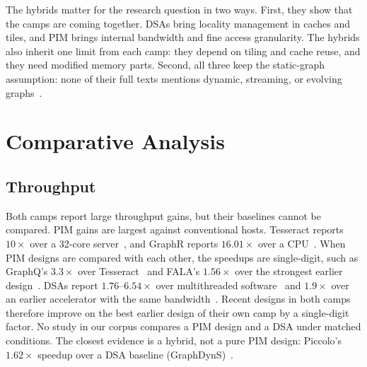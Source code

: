 \documentclass[journal,onecolumn]{IEEEtran}
\begin{document}
The hybrids matter for the research question in two ways. First, they show that the camps are coming together. DSAs bring locality management in caches and tiles, and PIM brings internal bandwidth and fine access granularity. The hybrids also inherit one limit from each camp: they depend on tiling and cache reuse, and they need modified memory parts. Second, all three keep the static-graph assumption: none of their full texts mentions dynamic, streaming, or evolving graphs~\cite{shin2025piccolo,shin2025fala,yenimol2026cograf}.

\section{Comparative Analysis}\label{sec:analysis}
\subsection{Throughput}
Both camps report large throughput gains, but their baselines cannot be compared. PIM gains are largest against conventional hosts. Tesseract reports $10\times$ over a 32-core server~\cite{ahn2015tesseract}, and GraphR reports $16.01\times$ over a CPU~\cite{song2018graphr}. When PIM designs are compared with each other, the speedups are single-digit, such as GraphQ's $3.3\times$ over Tesseract~\cite{zhuo2019graphq} and FALA's $1.56\times$ over the strongest earlier design~\cite{shin2025fala}. DSAs report $1.76$--$6.54\times$ over multithreaded software~\cite{ham2016graphicionado} and $1.9\times$ over an earlier accelerator with the same bandwidth~\cite{yan2019graphdyns}. Recent designs in both camps therefore improve on the best earlier design of their own camp by a single-digit factor. No study in our corpus compares a PIM design and a DSA under matched conditions. The closest evidence is a hybrid, not a pure PIM design: Piccolo's $1.62\times$ speedup over a DSA baseline (GraphDynS)~\cite{shin2025piccolo}.
\end{document}
